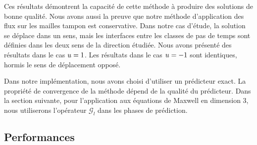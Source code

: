 \begin{figure}[!h]
\begin{center}
	\end{center}
\end{figure}

%
%
%
%


Ces résultats démontrent la capacité de cette méthode à produire des
solutions de bonne qualité. Nous avons aussi la preuve que notre
méthode d'application des flux sur les mailles tampon est conservative.
Dans notre cas d'étude, la solution se déplace dans un sens, mais
les interfaces entre les classes de pas de temps sont définies dans
les deux sens de la direction étudiée.
Nous avons présenté des résultats dans le cas $u=1$. Les résultats
dans le cas $u=-1$ sont identiques, hormis le sens de déplacement
opposé.

\begin{remark}
	Dans notre implémentation, nous avons choisi d'utiliser un prédicteur exact.
	La propriété de convergence de la méthode dépend de la qualité du prédicteur.
	Dans la section suivante, pour l'application aux équations de Maxwell
	en dimension $3$, nous utiliserons l'opérateur
	$\mathcal{G}_l$ dans les phases de prédiction.	
\end{remark}



\subsection{Performances}
\label{ssect:lts2 transport perfs}


